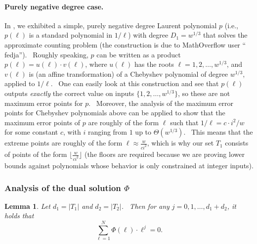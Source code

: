 \documentclass[10pt,a4paper]{article}
\newtheorem{lemma}[theorem]{Lemma}
\newcommand{\<}{\langle}
\renewcommand{\>}{\rangle}
\newcommand{\para}[1]{\paragraph{#1}}
\begin{document}
\para{Purely negative degree case.} In 
, we exhibited a simple, purely negative degree Laurent polynomial $p$
(i.e., $p(\ell )$ is a standard polynomial in $1/\ell $) with degree $
D_{1}=w^{1/3}$ that solves the approximate counting problem (the
construction is due to MathOverflow user \textquotedblleft
fedja\textquotedblright ). \ Roughly speaking, $p$ can be written as a
product $p(\ell )=u(\ell )\cdot v(\ell )$, where $u(\ell )$ has the roots $
\ell =1,2,\dots ,w^{1/3}$, and $v(\ell )$ is (an affine transformation) of a
Chebyshev polynomial of degree $w^{1/3}$, applied to $1/\ell $. \ One can
easily look at this construction and see that $p(\ell )$ outputs \emph{
exactly} the correct value on inputs $\{1,2,\dots ,w^{1/3}\}$, so these are
not maximum error points for $p$. \ Moreover, the analysis of the maximum
error points for Chebyshev polynomials above can be applied to show that the
maximum error points of $p$ are roughly of the form $\ell $ such that $
1/\ell =c\cdot i^{2}/w$ for some constant $c$, with $i$ ranging from $1$ up
to $\Theta (w^{1/3})$. \ This means that the extreme points are roughly of
the form $\ell \approx \frac{w}{ci^{2}}$, which is why our set $T_{1}$
consists of points of the form $\lfloor \frac{w}{ci^{2}}\rfloor $ (the
floors are required because we are proving lower bounds against polynomials
whose behavior is only constrained at integer inputs).

\subsubsection{Analysis of the dual solution \texorpdfstring{$\Phi$}{Phi}}

\begin{lemma}
\label{phdlem}Let $d_{1}=|T_{1}|$ and $d_{2}=|T_{2}|$. \ Then for any $
j=0,1,\dots ,d_{1}+d_{2}$, it holds that
\begin{equation*}
\sum_{\ell =1}^{N}\Phi (\ell )\cdot \ell ^{j}=0.
\end{equation*}
\end{lemma}
\end{document}
